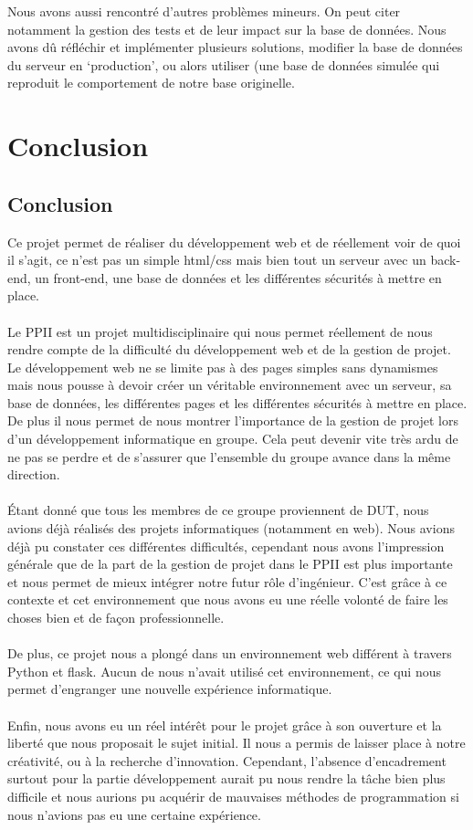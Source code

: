 \documentclass[12pt,titlepage]{report}
\begin{document}
Nous avons aussi rencontré d'autres problèmes mineurs. On peut citer notamment la gestion des tests et de leur impact sur la base de données. Nous avons dû réfléchir et implémenter plusieurs solutions, modifier la base de données du serveur en ‘production’, ou alors utiliser (une base de données simulée qui reproduit le comportement de notre base originelle.


\chapter{Conclusion}

\section{Conclusion}
Ce projet permet de réaliser du développement web et de réellement voir de quoi il s'agit, ce n'est pas un simple html/css mais bien tout un serveur avec un back-end, un front-end, une base de données et les différentes sécurités à mettre en place. \\ \\ 
Le PPII est un projet multidisciplinaire qui nous permet réellement de nous rendre compte de la difficulté du développement web et de la gestion de projet. Le développement web ne se limite pas à des pages simples sans dynamismes mais nous pousse à devoir créer un véritable environnement avec un serveur, sa base de données, les différentes pages et les différentes sécurités à mettre en place. De plus il nous permet de nous montrer l'importance de la gestion de projet lors d'un développement informatique en groupe. Cela peut devenir vite très ardu de ne pas se perdre et de s'assurer que l’ensemble du groupe avance dans la même direction. \\ \\ 
Étant donné que tous les membres de ce groupe proviennent de DUT, nous avions déjà réalisés des projets informatiques (notamment en web). Nous avions déjà pu constater ces différentes difficultés, cependant nous avons l’impression générale que de la part de la gestion de projet dans le PPII est plus importante et nous permet de mieux intégrer notre futur rôle d’ingénieur. C’est grâce à ce contexte et cet environnement que nous avons eu une réelle volonté de faire les choses bien et de façon professionnelle. \\ \\
De plus, ce projet nous a plongé dans un environnement web différent à travers Python et flask. Aucun de nous n’avait utilisé cet environnement, ce qui nous permet d’engranger une nouvelle expérience informatique. \\ \\
Enfin, nous avons eu un réel intérêt pour le projet grâce à son ouverture et la liberté que nous proposait le sujet initial. Il nous a permis de laisser place à notre créativité, ou à la recherche d’innovation. Cependant, l’absence d’encadrement surtout pour la partie développement aurait pu nous rendre la tâche bien plus difficile et nous aurions pu acquérir de mauvaises méthodes de programmation si nous n’avions pas eu une certaine expérience.
\end{document}
